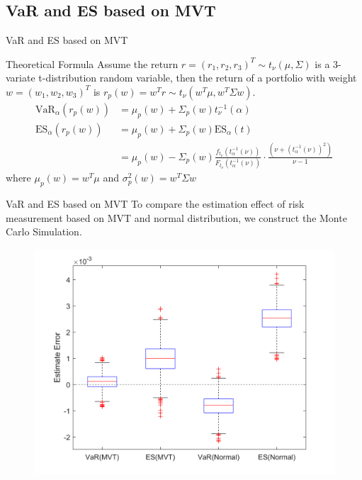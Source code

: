 \documentclass{beamer}
\begin{document}
\subsection{VaR and ES based on MVT}
\begin{frame}{VaR and ES based on MVT}

\begin{block}{Theoretical Formula}
Assume the return $r=(r_1,r_2,r_3)^T \sim t_{\nu}(\mu,\Sigma)$ is a 3-variate t-distribution random variable, then the return of a portfolio with weight $w=(w_1,w_2,w_3)^T$ is $r_p(w)=w^Tr \sim t_{\nu}(w^T\mu,w^T\Sigma w)$. 
\begin{equation} \label{E2.3}
\begin{aligned}
\text{VaR}_{\alpha}\left(r_p(w)\right) &= \mu_p(w) +\Sigma_p(w) t_{\nu}^{-1}(\alpha)    \\
\text{ES}_{\alpha}\left(r_p(w)\right) &= \mu_p(w) +\Sigma_p(w) \text{ES}_{\alpha}\left(t\right) \\
&=\mu_p(w) -\Sigma_p(w) \frac{f_{t_{\nu}}\left(t^{-1}_\alpha(\nu)\right)}{F_{t_{\nu}}\left(t^{-1}_\alpha(\nu)\right)} \cdot \frac{\left(\nu+(t^{-1}_\alpha(\nu))^2\right)}{\nu-1}
\end{aligned}
\end{equation}
where $\mu_p(w)=w^T\mu$ and $\sigma_p^2(w)=w^T\Sigma w$
\end{block}
\end{frame}

\begin{frame}{VaR and ES based on MVT} 
To compare the estimation effect of risk measurement based on MVT and normal distribution, we construct the Monte Carlo Simulation.
\begin{figure}[H]
    \centering
    \includegraphics[scale=0.5]{Figure/FIG4-MC.png}
    \label{Fig4}
\end{figure}



\end{frame}
\end{document}
